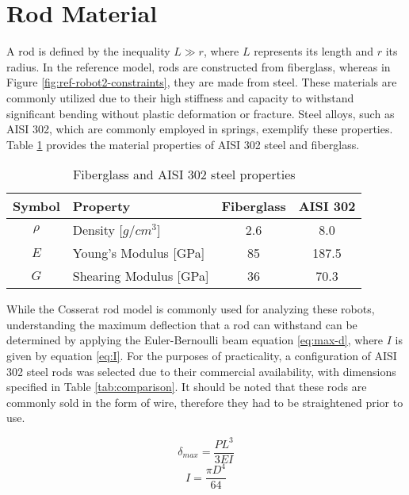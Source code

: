 \section{Rod Material}

A rod is defined by the inequality \( L \gg r \), where \( L \) represents its length and \( r \) its radius. In the reference model, rods are constructed from fiberglass, whereas in Figure \ref{fig:ref-robot2-constraints}, they are made from steel. These materials are commonly utilized due to their high stiffness and capacity to withstand significant bending without plastic deformation or fracture. Steel alloys, such as AISI 302, which are commonly employed in springs, exemplify these properties. Table \ref{tab:material-properties} provides the material properties of AISI 302 steel and fiberglass.

\begin{table}[h]
    \centering
    \caption{Fiberglass and AISI 302 steel properties}
    \label{tab:material-properties}
    \begin{tabular}{clcc}
    \toprule
    Symbol & Property                   & Fiberglass & AISI 302 \\ \midrule
    $\rho$ & Density [$g/cm^3$]        & 2.6        & 8.0      \\
    $E$    & Young's Modulus [GPa]  & 85         & 187.5    \\
    $G$    & Shearing Modulus [GPa] & 36         & 70.3     \\ \bottomrule
    \end{tabular}
\end{table}


While the Cosserat rod model \cite{russo2023} is commonly used for analyzing these robots, understanding the maximum deflection that a rod can withstand can be determined by applying the Euler-Bernoulli beam equation \ref{eq:max-d}, where \( I \) is given by equation \ref{eq:I}. For the purposes of practicality, a configuration of AISI 302 steel rods was selected due to their commercial availability, with dimensions specified in Table \ref{tab:comparison}. It should be noted that these rods are commonly sold in the form of wire, therefore they had to be straightened prior to use.

\begin{equation}
    \label{eq:max-d}
    \delta_{max}=\frac{PL^3}{3EI}
\end{equation}
\begin{equation}
    \label{eq:I}
    I=\frac{\pi D^4}{64}
\end{equation}

